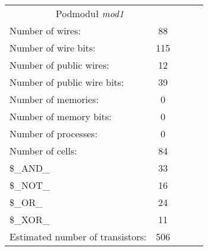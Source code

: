 \begin{table}[!htb]
	\begin{minipage}{0.55\linewidth}
		\centering
		\begin{tabular}{lllll}
			\cline{1-2}
			\multicolumn{2}{|c|}{Podmoduł \emph{mod1}} &  &  &  \\ \cline{1-2}
			\multicolumn{1}{|l|}{Number of wires:} & \multicolumn{1}{c|}{88} &  &  &  \\ \cline{1-2}
			\multicolumn{1}{|l|}{Number of wire bits:} & \multicolumn{1}{c|}{115} &  &  &  \\ \cline{1-2}
			\multicolumn{1}{|l|}{Number of public wires:} & \multicolumn{1}{c|}{12} &  &  &  \\ \cline{1-2}
			\multicolumn{1}{|l|}{Number of public wire bits:} & \multicolumn{1}{c|}{39} &  &  &  \\ \cline{1-2}
			\multicolumn{1}{|l|}{Number of memories:} & \multicolumn{1}{c|}{0} &  &  &  \\ \cline{1-2}
			\multicolumn{1}{|l|}{Number of memory bits: } & \multicolumn{1}{c|}{0} &  &  &  \\ \cline{1-2}
			\multicolumn{1}{|l|}{Number of processes: } & \multicolumn{1}{c|}{0} &  &  &  \\ \cline{1-2}
			\multicolumn{1}{|l|}{Number of cells:} & \multicolumn{1}{c|}{84} &  &  &  \\ \cline{1-2}
			\multicolumn{1}{|l|}{\$\_AND\_} & \multicolumn{1}{c|}{33} &  &  &  \\ \cline{1-2}
			\multicolumn{1}{|l|}{\$\_NOT\_} & \multicolumn{1}{c|}{16} &  &  &  \\ \cline{1-2}
			\multicolumn{1}{|l|}{\$\_OR\_} & \multicolumn{1}{c|}{24} &  &  &  \\ \cline{1-2}
			\multicolumn{1}{|l|}{\$\_XOR\_} & \multicolumn{1}{c|}{11} &  &  &  \\ \cline{1-2}
			\multicolumn{1}{|l|}{Estimated number of transistors:} & \multicolumn{1}{c|}{506} &  &  &  \\ \cline{1-2}
			

\end{tabular}
\end{minipage}
\end{table}
